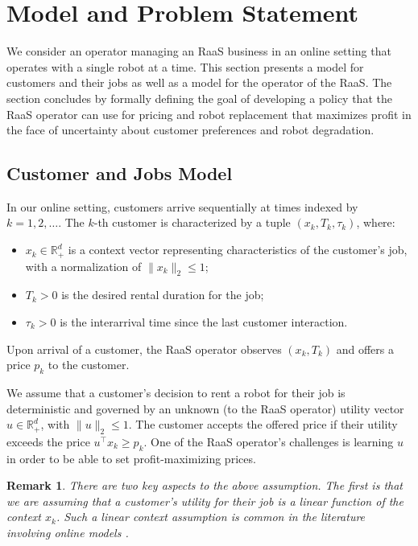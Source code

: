 \documentclass[conference]{IEEEtran}
\newtheorem{remark}{Remark}
\begin{document}
\section{Model and Problem Statement}
\label{sec:s&m}

We consider an operator managing an RaaS business in an online setting that operates with a single robot at a time. This section presents a model for customers and their jobs as well as a model for the operator of the RaaS. The section concludes by formally defining the goal of developing a policy that the RaaS operator can use for pricing and robot replacement that maximizes profit in the face of uncertainty about customer preferences and robot degradation.

\subsection{Customer and Jobs Model}

In our online setting, customers arrive sequentially at times indexed by $k=1, 2, \dots$. The $k$-th customer is characterized by a tuple $(x_k, T_k, \tau_k)$, where:
\begin{itemize}
    \item $x_k \in \mathbb{R}_+^d$ is a context vector representing characteristics of the customer's job, with a normalization of $\|x_k\|_2 \leq 1$;
    \item $T_k > 0$ is the desired rental duration for the job;
    \item $\tau_k > 0$ is the interarrival time since the last customer interaction.
\end{itemize}
Upon arrival of a customer, the RaaS operator observes $(x_k, T_k)$ and offers a price $p_k$ to the customer.

We assume that a customer's decision to rent a robot for their job is deterministic and governed by an unknown (to the RaaS operator) utility vector $u \in \mathbb{R}_+^d$, with $\|u\|_2 \leq 1$. The customer accepts the offered price if their utility exceeds the price $u^\top x_k \geq p_k$. One of the RaaS operator's challenges is learning $u$ in order to be able to set profit-maximizing prices.

\begin{remark}
    There are two key aspects to the above assumption. The first is that we are assuming that a customer's utility for their job is a linear function of the context $x_k$. Such a linear context assumption is common in the literature involving online models \cite{agrawal2013thompson,dimakopoulou2019balanced,bastani2021mostly}. 
\end{remark}
\end{document}
